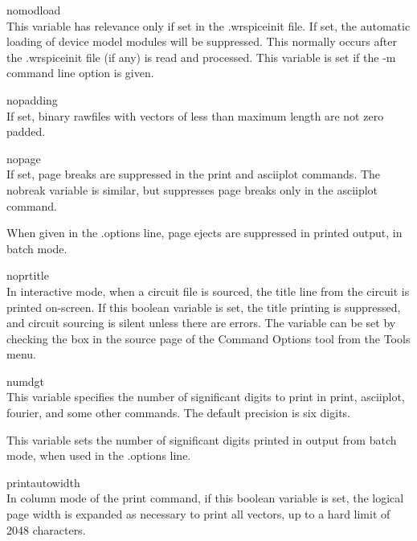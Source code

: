 \begin{description}
\item{\et nomodload}\\
This variable has relevance only if set in the {\vt .wrspiceinit}
file.  If set, the automatic loading of device model modules will be
suppressed.  This normally occurs after the {\vt .wrspiceinit} file
(if any) is read and processed.  This variable is set if the {\vt -m}
command line option is given.

\item{\et nopadding}\\
If set, binary rawfiles with vectors of less than maximum length are
not zero padded.

\item{\et nopage}\\
If set, page breaks are suppressed in the {\cb print} and {\cb
asciiplot} commands.  The {\et nobreak} variable is similar, but
suppresses page breaks only in the {\cb asciiplot} command.

When given in the {\vt .options} line, page ejects are suppressed in
printed output, in batch mode.

\item{\et noprtitle}\\
In interactive mode, when a circuit file is sourced, the title line
from the circuit is printed on-screen.  If this boolean variable is
set, the title printing is suppressed, and circuit sourcing is silent
unless there are errors.  The variable can be set by checking the box
in the {\cb source} page of the {\cb Command Options} tool from the
{\cb Tools} menu.

\item{\et numdgt}\\
This variable specifies the number of significant digits to print in
{\cb print}, {\cb asciiplot}, {\cb fourier}, and some other commands. 
The default precision is six digits.

This variable sets the number of significant digits printed in output
from batch mode, when used in the {\vt .options} line.

\item{\et printautowidth}\\
In column mode of the {\cb print} command, if this boolean variable is
set, the logical page width is expanded as necessary to print all
vectors, up to a hard limit of 2048 characters.


\end{description}
